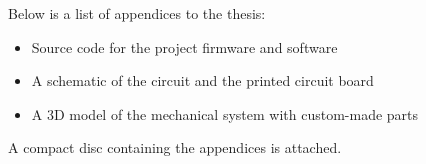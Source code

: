 Below is a list of appendices to the thesis:
\begin{itemize}
    \item Source code for the project firmware and software
    \item A schematic of the circuit and the printed circuit board
    \item A 3D model of the mechanical system with custom-made parts
\end{itemize}
A compact disc containing the appendices is attached.

